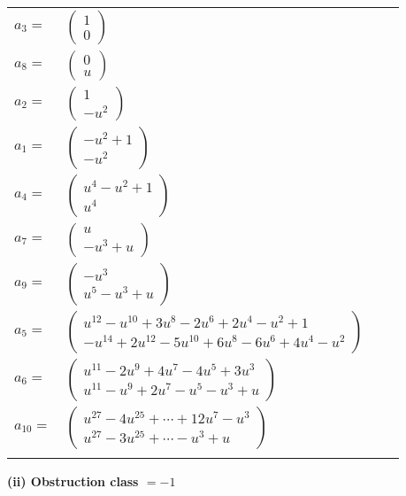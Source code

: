 \documentclass[1p]{elsarticle_modified}
\theoremstyle{definition}
\begin{document}
\begin{tabular}{m{7pt} m{180pt} m{7pt} m{180pt} }
\flushright $a_{3}=$&$\begin{pmatrix}1\\0\end{pmatrix}$ \\
\flushright $a_{8}=$&$\begin{pmatrix}0\\u\end{pmatrix}$ \\
\flushright $a_{2}=$&$\begin{pmatrix}1\\- u^2\end{pmatrix}$ \\
\flushright $a_{1}=$&$\begin{pmatrix}- u^2+1\\- u^2\end{pmatrix}$ \\
\flushright $a_{4}=$&$\begin{pmatrix}u^4- u^2+1\\u^4\end{pmatrix}$ \\
\flushright $a_{7}=$&$\begin{pmatrix}u\\- u^3+u\end{pmatrix}$ \\
\flushright $a_{9}=$&$\begin{pmatrix}- u^3\\u^5- u^3+u\end{pmatrix}$ \\
\flushright $a_{5}=$&$\begin{pmatrix}u^{12}- u^{10}+3 u^8-2 u^6+2 u^4- u^2+1\\- u^{14}+2 u^{12}-5 u^{10}+6 u^8-6 u^6+4 u^4- u^2\end{pmatrix}$ \\
\flushright $a_{6}=$&$\begin{pmatrix}u^{11}-2 u^9+4 u^7-4 u^5+3 u^3\\u^{11}- u^9+2 u^7- u^5- u^3+u\end{pmatrix}$ \\
\flushright $a_{10}=$&$\begin{pmatrix}u^{27}-4 u^{25}+\cdots+12 u^7- u^3\\u^{27}-3 u^{25}+\cdots- u^3+u\end{pmatrix}$\\&\end{tabular}
\flushleft \textbf{(ii) Obstruction class $= -1$}\\~\\
\end{document}
